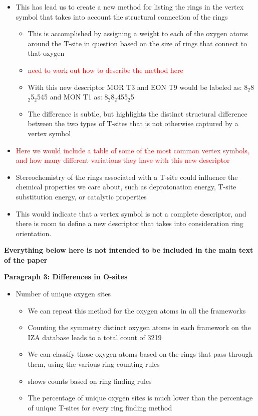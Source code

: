 \documentclass[11pt]{article}
\newcommand{\red}[1]{\textcolor{red}{#1}}
\begin{document}
\begin{itemize}
\item This has lead us to create a new method for listing the rings in the vertex symbol that takes into account the structural connection of the rings
\begin{itemize}
\item This is accomplished by assigning a weight to each of the oxygen atoms around the T-site in question based on the size of rings that connect to that oxygen
\item \red{need to work out how to describe the method here}
\item With this new descriptor MOR T3 and EON T9 would be labeled as: 8\(_{\text{2}}\)\textbullet{}8\(_{\text{2}}\)\textbullet{}5\(_{\text{2}}\)\textbullet{}5\textbullet{}4\textbullet{}5 and MON T1 as: 8\(_{\text{2}}\)\textbullet{}8\(_{\text{2}}\)\textbullet{}4\textbullet{}5\textbullet{}5\(_{\text{2}}\)\textbullet{}5
\item The difference is subtle, but highlights the distinct structural  difference between the two types of T-sites that is not otherwise captured by a vertex symbol
\end{itemize}
\item \red{Here we would include a table of some of the most common vertex symbols, and how many different variations they have with this new descriptor}

\item Stereochemistry of the rings associated with a T-site could influence the chemical properties we care about, such as deprotonation energy, T-site substitution energy, or catalytic properties
\item This would indicate that a vertex symbol is not a complete descriptor, and there is room to define a new descriptor that takes into consideration ring orientation.
\end{itemize}

\textbf{\textbf{Everything below here is not intended to be included in the main text of the paper}}

\textbf{\textbf{Paragraph 3: Differences in O-sites}}
\begin{itemize}
\item Number of unique oxygen sites
\begin{itemize}
\item We can repeat this method for the oxygen atoms in all the frameworks
\item Counting the symmetry distinct oxygen atoms in each framework on the IZA database leads to a total count of 3219
\item We can classify those oxygen atoms based on the rings that pass through them, using the various ring counting rules
\item {} shows counts based on ring finding rules
\item The percentage of unique oxygen sites is much lower than the percentage of unique T-sites for every ring finding method
\end{itemize}
\end{itemize}
\end{document}
